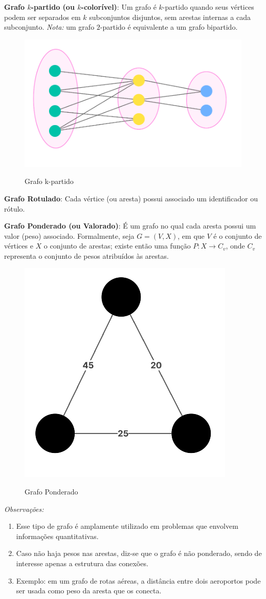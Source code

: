 \textbf{Grafo $k$-partido (ou $k$-colorível)}:
Um grafo é $k$-partido quando seus vértices podem ser separados em $k$ subconjuntos disjuntos, sem arestas internas a cada subconjunto.
\textit{Nota:} um grafo $2$-partido é equivalente a um grafo bipartido.

\begin{figure} [H]
	\centering
	\caption{Grafo k-partido}%
	\label{fig:kpartido}%
	\includegraphics[width=0.4\linewidth,angle=0]{figuras/grafo_k-partido.png}%
	\\
\end{figure}

\textbf{Grafo Rotulado}:
Cada vértice (ou aresta) possui associado um identificador ou rótulo.

\textbf{Grafo Ponderado (ou Valorado)}:
É um grafo no qual cada aresta possui um valor (peso) associado. Formalmente, seja $G = (V, X)$, em que $V$ é o conjunto de vértices e $X$ o conjunto de arestas; existe então uma função $P: X \to C_v$, onde $C_v$ representa o conjunto de pesos atribuídos às arestas.

\begin{figure} [H]
	\centering
	\caption{Grafo Ponderado}%
	\label{fig:ponderado}%
	\includegraphics[width=0.2\linewidth,angle=0]{figuras/grafo_ponderado.png}%
	\\
\end{figure}

\textit{Observações:}
\begin{enumerate}
    \item Esse tipo de grafo é amplamente utilizado em problemas que envolvem informações quantitativas.
    \item Caso não haja pesos nas arestas, diz-se que o grafo é não ponderado, sendo de interesse apenas a estrutura das conexões.
    \item Exemplo: em um grafo de rotas aéreas, a distância entre dois aeroportos pode ser usada como peso da aresta que os conecta.
\end{enumerate}

